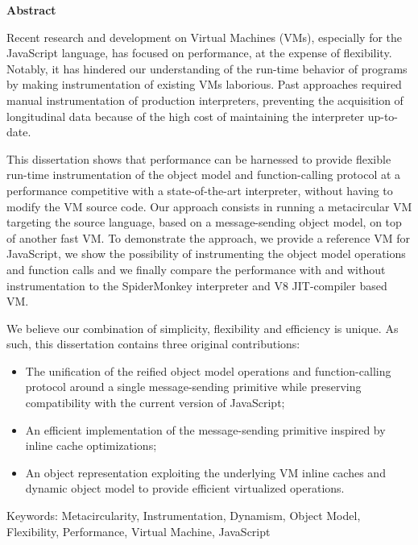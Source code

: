 \begin{center}
\textbf{\large Abstract}
\end{center}

\vspace{1cm}

Recent research and development on Virtual Machines (VMs), especially for the
JavaScript language, has focused on performance, at the expense of flexibility.
Notably, it has hindered our understanding of the run-time behavior of programs
by making instrumentation of existing VMs laborious. Past approaches required
manual instrumentation of production interpreters, preventing the acquisition
of longitudinal data because of the high cost of maintaining the interpreter
up-to-date.
			
This dissertation shows that performance can be harnessed to provide flexible
run-time instrumentation of the object model and function-calling protocol at a
performance competitive with a state-of-the-art interpreter, without having to
modify the VM source code. Our approach consists in running a metacircular VM
targeting the source language, based on a message-sending object model, on top
of another fast VM. To demonstrate the approach, we provide a reference VM for
JavaScript, we show the possibility of instrumenting the object model
operations and function calls and we finally compare the performance with and
without instrumentation to the SpiderMonkey interpreter and V8 JIT-compiler
based VM.
			
We believe our combination of simplicity, flexibility and efficiency is unique.
As such, this dissertation contains three original contributions:

\begin{itemize}
    \item The unification of the reified object model operations and
        function-calling protocol around a single message-sending primitive
        while preserving compatibility with the current version of JavaScript;
    \item An efficient implementation of the message-sending primitive inspired
          by inline cache optimizations;
    \item An object representation exploiting the underlying VM inline caches
          and dynamic object model to provide efficient virtualized operations.
\end{itemize}

Keywords: Metacircularity, Instrumentation, Dynamism, Object Model,
Flexibility, Performance, Virtual Machine, JavaScript  
